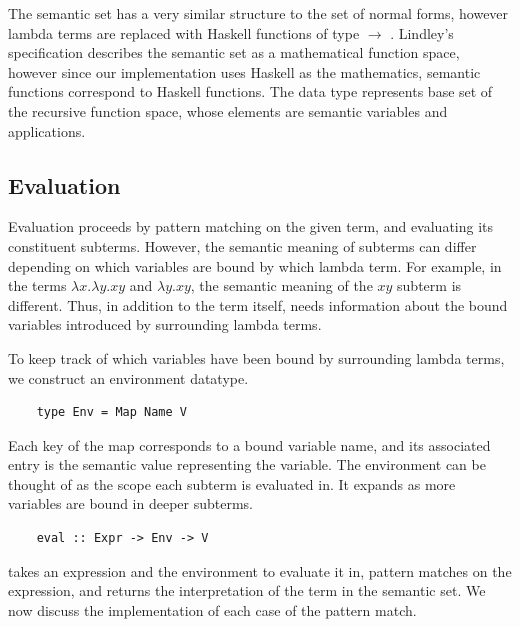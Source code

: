 The semantic set  has a very similar structure to the set of normal forms, however lambda terms are replaced with Haskell functions of type  $\rightarrow$ . Lindley's specification \cite{slides} describes the semantic set as a mathematical function space, however since our implementation uses Haskell as the mathematics, semantic functions correspond to Haskell functions. The  data type represents base set of the recursive function space, whose elements are semantic variables and applications.

\vspace{\baselineskip}

\subsection{Evaluation}

Evaluation proceeds by pattern matching on the given term, and evaluating its constituent subterms. However, the semantic meaning of subterms can differ depending on which variables are bound by which lambda term. For example, in the terms $\lambda x . \lambda y . xy$ and $\lambda y . xy$, the semantic meaning of the $xy$ subterm is different. Thus, in addition to the term itself,  needs information about the bound variables introduced by surrounding lambda terms. 

To keep track of which variables have been bound by surrounding lambda terms, we construct an environment datatype.

\begin{lstlisting}
    type Env = Map Name V
\end{lstlisting}

Each key of the map corresponds to a bound variable name, and its associated entry is the semantic value representing the variable. The environment can be thought of as the scope each subterm is evaluated in. 
It expands as more variables are bound in deeper subterms.

\begin{lstlisting}
    eval :: Expr -> Env -> V
\end{lstlisting}

 takes an expression and the environment to evaluate it in, pattern matches on the expression, and returns the interpretation of the term in the semantic set. We now discuss the implementation of each case of the pattern match.

